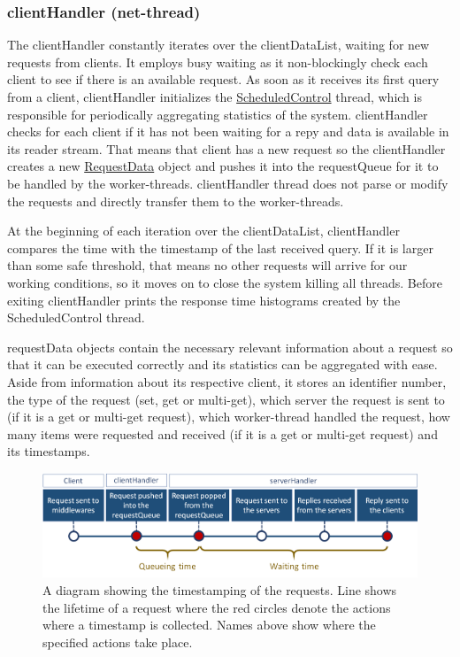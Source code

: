 \documentclass[11pt,a4paper]{article}
\begin{document}
\subsubsection{clientHandler (net-thread)} \label{sec:ov-netthread}
The clientHandler constantly iterates over the clientDataList, waiting for new requests from clients. It employs busy waiting as it non-blockingly check each client to see if there is an available request. As soon as it receives its first query from a client, clientHandler initializes the \underline{ScheduledControl} thread, which is responsible for periodically aggregating statistics of the system. clientHandler checks for each client if it has not been waiting for a repy and data is available in its reader stream. That means that client has a new request so the clientHandler creates a new \underline{RequestData} object and pushes it into the requestQueue for it to be handled by the worker-threads. clientHandler thread does not parse or modify the requests and directly transfer them to the worker-threads.
\par At the beginning of each iteration over the clientDataList, clientHandler compares the time with the timestamp of the last received query. If it is larger than some safe threshold, that means no other requests will arrive for our working conditions, so it moves on to close the system killing all threads. Before exiting clientHandler prints the response time histograms created by the ScheduledControl thread.
\par requestData objects contain the necessary relevant information about a request so that it can be executed correctly and its statistics can be aggregated with ease. Aside from information about its respective client, it stores an identifier number, the type of the request (set, get or multi-get), which server the request is sent to (if it is a get or multi-get request), which worker-thread handled the request, how many items were requested and received (if it is a get or multi-get request) and its timestamps.
\begin{figure}[h!]
  \centering
  \includegraphics[width=0.8\linewidth,trim={0px 0px 0px 0px},clip]{img/timing.png}
  \caption{A diagram showing the timestamping of the requests. Line shows the lifetime of a request where the red circles denote the actions where a timestamp is collected. Names above show where the specified actions take place.}
  \label{fig:timing}
\end{figure}
\end{document}
